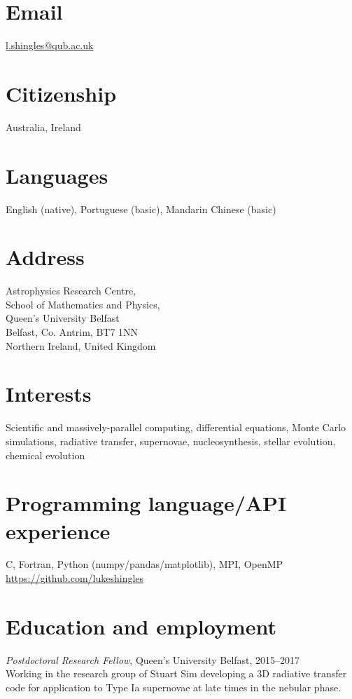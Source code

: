 \documentclass[11pt]{res} %
\begin{document}

\begin{resume}

\section{Email}
  \href{mailto:l.shingles@qub.ac.uk}{l.shingles@qub.ac.uk}

\section{Citizenship}
  Australia, Ireland

\section{Languages}
  English (native), Portuguese (basic), Mandarin Chinese (basic)

\section{Address}
  Astrophysics Research Centre,\\
  School of Mathematics and Physics,\\
  Queen's University Belfast\\
  Belfast, Co. Antrim, BT7 1NN\\
  Northern Ireland, United Kingdom

\section{Interests}
   Scientific and massively-parallel computing, differential equations, Monte Carlo simulations, radiative transfer,
   supernovae, nucleosynthesis, stellar evolution, chemical evolution

\section{Programming language/API experience}
  C, Fortran, Python (numpy/pandas/matplotlib), MPI, OpenMP\\
  \href{https://github.com/lukeshingles}{https://github.com/lukeshingles}

\section{Education and employment}
  {\it Postdoctoral Research Fellow}, Queen's University Belfast, 2015--2017\\
  Working in the research group of Stuart Sim developing a 3D radiative transfer code for application to Type Ia supernovae at late times in the nebular phase.


\end{resume}
\end{document}
